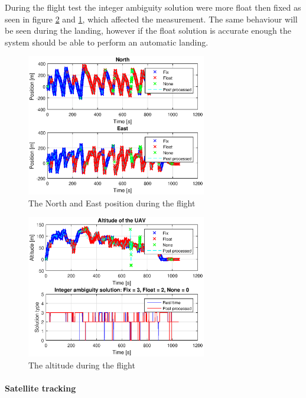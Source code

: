 During the flight test the integer ambiguity solution were more float then fixed as seen in figure \ref{figure:DownFlight} and \ref{figure:NorthEastFlight}, which affected the measurement. The same behaviour will be seen during the landing, however if the float solution is accurate enough the system should be able to perform an automatic landing.
\begin{figure}[H]
	\centering
		\includegraphics[width=0.7\textwidth]{figs/plots/northEastFlight.eps}
		\caption{The North and East position during the flight}
		\label{figure:NorthEastFlight}
\end{figure}
\begin{figure}[H]
	\centering
		\includegraphics[width=0.7\textwidth]{figs/plots/AltitudeFlight.eps}
		\caption{The altitude during the flight}
		\label{figure:DownFlight}
\end{figure}
\paragraph{Satellite tracking}~\\

